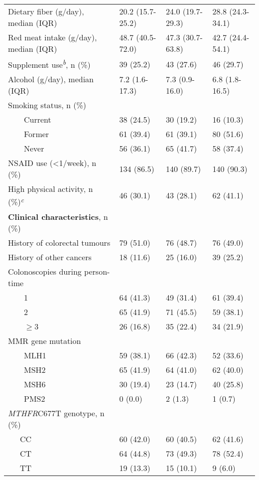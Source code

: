 \begin{table}
\begin{adjustbox}{width=\textwidth}
\begin{tabular}{C{4.795cm}C{3.5cm}C{3.5cm}C{3.3cm}}
 Dietary fiber (g/day), median (IQR) & 20.2 (15.7-25.2) & 24.0 (19.7-29.3) & 28.8 (24.3-34.1)\\
 Red meat intake (g/day), median (IQR) & 48.7 (40.5-72.0) & 47.3 (30.7-63.8) & 42.7 (24.4-54.1)\\
{Supplement
use}{\textit{\textsuperscript{b}}}{, n (\%)} & 39 (25.2) & 43 (27.6) & 46 (29.7)\\
 Alcohol (g/day), median (IQR) & 7.2 (1.6-17.3) & 7.3 (0.9-16.0) & 6.8 (1.8-16.5)\\
 Smoking status, n (\%) & ~ & ~ & ~ \\
 \ \ \ \ Current & 38 (24.5) & 30 (19.2) & 16 (10.3)\\
 \ \ \ \ Former & 61 (39.4) & 61 (39.1) & 80 (51.6)\\
 \ \ \ \ Never & 56 (36.1) & 65 (41.7) & 58 (37.4)\\
 NSAID use ({\textless}1/week), n (\%) & 134 (86.5) & 140 (89.7) & 140 (90.3)\\
{High physical activity, n (\%)}{\textit{\textsuperscript{c}}} & 46 (30.1) & 43 (28.1) & 62 (41.1)\\
\hline

{\textbf{Clinical characteristics}}{, n (\%)} & ~ & ~ & ~ \\
\hline
{History of colorectal tumours} & 79 (51.0) & 76 (48.7) & 76 (49.0)\\
 History of other cancers & 18 (11.6) & 25 (16.0) & 39 (25.2)\\
 Colonoscopies during person-time & ~ & ~ & ~ \\
 \ \ \ \ 1 & 64 (41.3) & 49 (31.4) & 61 (39.4)\\
 \ \ \ \ 2 & 65 (41.9) & 71 (45.5) & 59 (38.1)\\
 \ \ \ \ ${\geq}$3 & 26 (16.8) & 35 (22.4) & {34 (21.9)}\\
 MMR gene mutation & ~ & ~ & ~ \\
 \ \ \ \ MLH1 & 59 (38.1) & 66 (42.3) & 52 (33.6)\\
 \ \ \ \ MSH2 \ \ & 65 (41.9) & 64 (41.0) & 62 (40.0)\\
 \ \ \ \ MSH6 & 30 (19.4) & 23 (14.7) & 40 (25.8)\\
 \ \ \ \ PMS2 & 0 (0.0) & 2 (1.3) & 1 (0.7)\\
{\textit{MTHFR}}{C677T genotype, n (\%)} & ~ & ~ & ~ \\
 \ \ \ CC & 60 (42.0) & 60 (40.5) & 62 (41.6)\\
 \ \ \ CT & 64 (44.8) & 73 (49.3) & 78 (52.4)\\
 \ \ \ TT & 19 (13.3) & 15 (10.1) & 9 (6.0)\\
\hline
\end{tabular}
\end{adjustbox}
\end{table}


